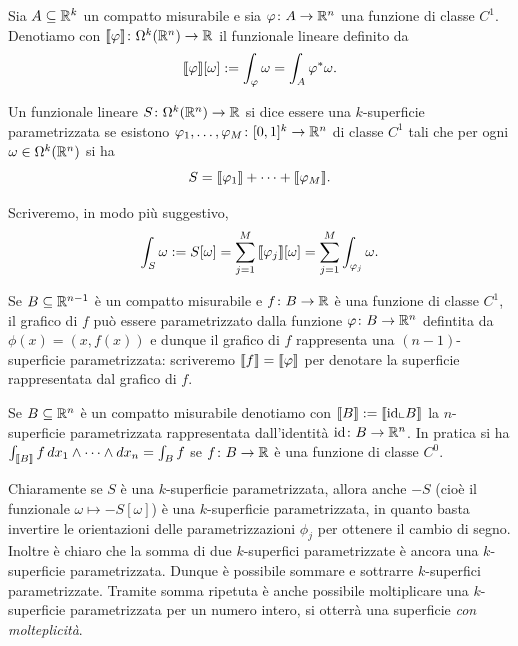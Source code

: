 \begin{definition}
Sia $A\subseteq {\mathbb R}^k$ un compatto misurabile e sia 
$\varphi\colon A \to {\mathbb R}^n$ una funzione di classe $C^1$.
Denotiamo con ${\left\llbracket \varphi \right\rrbracket}\colon \Omega^k({\mathbb R}^n)\to {\mathbb R}$ il funzionale lineare definito da
\[
  {\left\llbracket \varphi \right\rrbracket}[\omega] := \int_\varphi \omega = \int_A \varphi^* \omega.
\]

Un funzionale lineare $S\colon \Omega^k({\mathbb R}^n)\to {\mathbb R}$ si dice essere una 
$k$-superficie parametrizzata
se esistono $\varphi_1, \dots, \varphi_M \colon [0,1]^k \to {\mathbb R}^n$ di classe $C^1$ 
tali che per ogni $\omega \in \Omega^k({\mathbb R}^n)$ si ha
\[
   S = {\left\llbracket \varphi_1 \right\rrbracket} + \dots + {\left\llbracket \varphi_M \right\rrbracket}.
\]

Scriveremo, in modo più suggestivo, 
\[
  \int_S \omega 
    := S[\omega] 
    = \sum_{j=1}^M {\left\llbracket \varphi_j \right\rrbracket}[\omega]
    = \sum_{j=1}^M \int_{\varphi_j} \omega.
\]

Se $B\subseteq {\mathbb R}^{n-1}$ è un compatto misurabile e $f\colon B\to {\mathbb R}$ è 
una funzione di classe $C^1$, il grafico di $f$ 
può essere parametrizzato dalla funzione $\varphi\colon B\to {\mathbb R}^n$ defintita 
da $\phi(x) = (x,f(x))$ e dunque il grafico di $f$ rappresenta 
una $(n-1)$-superficie parametrizzata: scriveremo ${\left\llbracket f \right\rrbracket}  = {\left\llbracket \varphi \right\rrbracket}$
per denotare la superficie rappresentata dal grafico di $f$.

Se $B\subseteq {\mathbb R}^n$ è un compatto misurabile denotiamo con ${\left\llbracket B \right\rrbracket}:= {\left\llbracket \mathrm{id}\llcorner B \right\rrbracket}$ 
la $n$-superficie parametrizzata rappresentata dall'identità $\mathrm{id}\colon B \to {\mathbb R}^n$.
In pratica si ha $\int_{{\left\llbracket B \right\rrbracket}} f\, dx_1 \wedge \cdots \wedge dx_n = \int_B f$ 
se $f\colon B\to {\mathbb R}$ è una funzione di classe $C^0$.
\end{definition}

Chiaramente se $S$ è una $k$-superficie parametrizzata, 
allora anche $-S$ (cioè il funzionale $\omega\mapsto -S[\omega]$) 
è una $k$-superficie parametrizzata, in quanto basta invertire le orientazioni 
delle parametrizzazioni $\phi_j$ per ottenere il cambio di segno.
Inoltre è chiaro che la somma di due $k$-superfici parametrizzate è ancora una $k$-superficie parametrizzata.
Dunque è possibile sommare e sottrarre $k$-superfici parametrizzate.
Tramite somma ripetuta è anche possibile moltiplicare una $k$-superficie parametrizzata per un numero intero,
si otterrà una superficie \emph{con molteplicità}.

